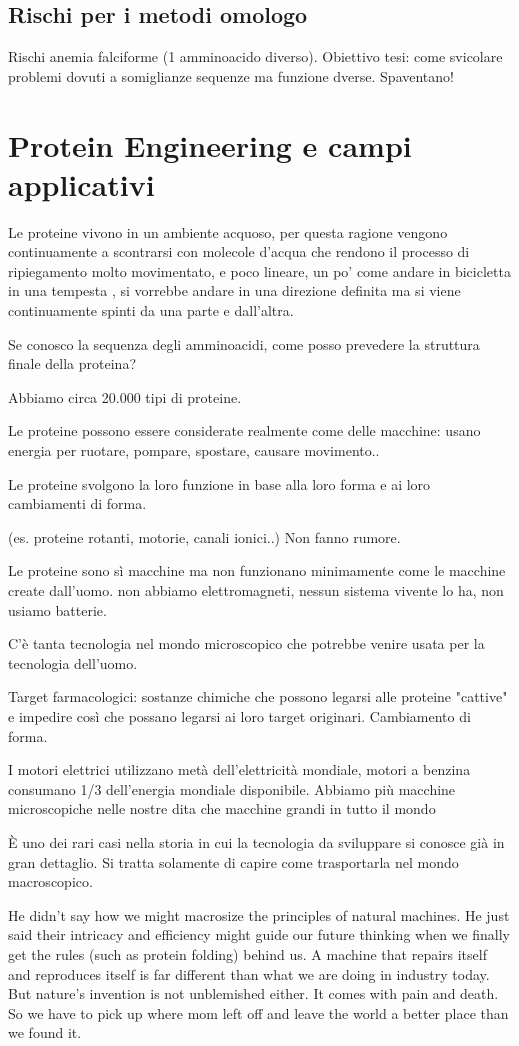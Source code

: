 \section{Rischi per i metodi omologo}
Rischi anemia falciforme (1 amminoacido diverso).
Obiettivo tesi: come svicolare problemi dovuti a somiglianze sequenze ma funzione dverse. Spaventano! 


\chapter{Protein Engineering e campi applicativi}
Le proteine vivono in un ambiente acquoso, per questa ragione vengono continuamente a scontrarsi con molecole d'acqua che rendono il processo di ripiegamento molto movimentato, e poco lineare, un po' come andare in bicicletta in una tempesta \cite{}, si vorrebbe andare in una direzione definita ma si viene continuamente spinti da una parte e dall'altra.

Se conosco la sequenza degli amminoacidi, come posso prevedere la struttura finale della proteina?

Abbiamo circa 20.000 tipi di proteine.

Le proteine possono essere considerate realmente come delle macchine: usano energia per ruotare, pompare, spostare, causare movimento..

Le proteine svolgono la loro funzione in base alla loro forma e ai loro cambiamenti di forma.

(es. proteine rotanti, motorie, canali ionici..)
Non fanno rumore. 

Le proteine sono sì macchine ma non funzionano minimamente come le macchine create dall'uomo. non abbiamo elettromagneti, nessun sistema vivente lo ha, non usiamo batterie. 

C'è tanta tecnologia nel mondo microscopico che potrebbe venire usata per la tecnologia dell'uomo.

Target farmacologici: sostanze chimiche che possono legarsi alle proteine "cattive" e impedire così che possano legarsi ai loro target originari.
Cambiamento di forma.

I motori elettrici utilizzano metà dell'elettricità mondiale, motori a benzina consumano 1/3 dell'energia mondiale disponibile.
Abbiamo più macchine microscopiche nelle nostre dita che macchine grandi in tutto il mondo

È uno dei rari casi nella storia in cui la tecnologia da sviluppare si conosce già in gran dettaglio. Si tratta solamente di capire come trasportarla nel mondo macroscopico.

He didn't say how we might macrosize the principles of natural machines. He just said their intricacy and efficiency might guide our future thinking when we finally get the rules (such as protein folding) behind us. A machine that repairs itself and reproduces itself is far different than what we are doing in industry today. But nature's invention is not unblemished either. It comes with pain and death. So we have to pick up where mom left off and leave the world a better place than we found it.


